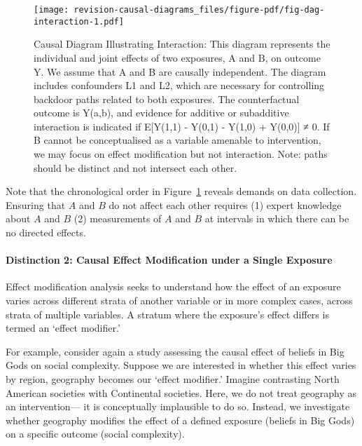 \documentclass[
  singlecolumn,
  9pt]{article}
\let\oldparagraph\paragraph
\renewcommand{\paragraph}[1]{\oldparagraph{#1}\mbox{}}
\begin{document}
\begin{figure}

{\centering \texttt{[image: revision-causal-diagrams\_files/figure-pdf/fig-dag-interaction-1.pdf]}

}

\caption{\label{fig-dag-interaction}Causal Diagram Illustrating
Interaction: This diagram represents the individual and joint effects of
two exposures, A and B, on outcome Y. We assume that A and B are
causally independent. The diagram includes confounders L1 and L2, which
are necessary for controlling backdoor paths related to both exposures.
The counterfactual outcome is Y(a,b), and evidence for additive or
subadditive interaction is indicated if E{[}Y(1,1) - Y(0,1) - Y(1,0) +
Y(0,0){]} ≠ 0. If B cannot be conceptualised as a variable amenable to
intervention, we may focus on effect modification but not interaction.
Note: paths should be distinct and not intersect each other.}

\end{figure}

Note that the chronological order in Figure~\ref{fig-dag-interaction}
reveals demands on data collection. Ensuring that \(A\) and \(B\) do not
affect each other requires (1) expert knowledge about \(A\) and \(B\)
(2) measurements of \(A\) and \(B\) at intervals in which there can be
no directed effects.

\paragraph{Distinction 2: Causal Effect Modification under a Single
Exposure}\label{distinction-2-causal-effect-modification-under-a-single-exposure}

Effect modification analysis seeks to understand how the effect of an
exposure varies across different strata of another variable or in more
complex cases, across strata of multiple variables. A stratum where the
exposure's effect differs is termed an `effect modifier.'

For example, consider again a study assessing the causal effect of
beliefs in Big Gods on social complexity. Suppose we are interested in
whether this effect varies by region, geography becomes our `effect
modifier.' Imagine contrasting North American societies with Continental
societies. Here, we do not treat geography as an intervention--- it is
conceptually implausible to do so. Instead, we investigate whether
geography modifies the effect of a defined exposure (beliefs in Big
Gods) on a specific outcome (social complexity).
\end{document}
